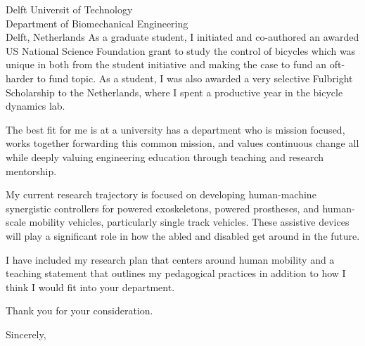 \documentclass{letter}
\begin{document}
\begin{letter}{
  Delft Universit of Technology \\
  Department of Biomechanical Engineering \\
  Delft, Netherlands
}
As a graduate student, I initiated and co-authored an awarded US National
Science Foundation grant to study the control of bicycles which was unique in
both from the student initiative and making the case to fund an oft-harder to
fund topic. As a student, I was also awarded a very selective Fulbright
Scholarship to the Netherlands, where I spent a productive year in the bicycle
dynamics lab.

The best fit for me is at a university has a department who is
mission focused, works together forwarding this common mission, and values
continuous change all while deeply valuing engineering education through
teaching and research mentorship.

My current research trajectory is focused on developing human-machine
synergistic controllers for powered exoskeletons, powered prostheses, and
human-scale mobility vehicles, particularly single track vehicles. These
assistive devices will play a significant role in how the abled and disabled
get around in the future.

I have included my research plan that centers around human mobility and a
teaching statement that outlines my pedagogical practices in addition to how I
think I would fit into your department.

Thank you for your consideration.

\closing{Sincerely,}

\end{letter}
\end{document}
